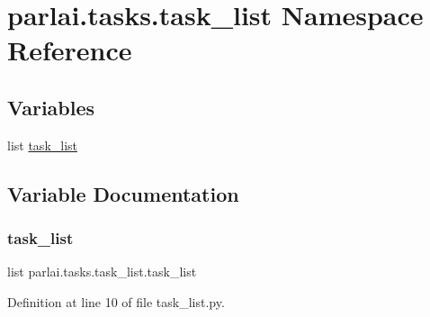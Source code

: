 \hypertarget{namespaceparlai_1_1tasks_1_1task__list}{}\section{parlai.\+tasks.\+task\+\_\+list Namespace Reference}
\label{namespaceparlai_1_1tasks_1_1task__list}
\subsection*{Variables}
\begin{DoxyCompactItemize}
\item 
list \hyperlink{namespaceparlai_1_1tasks_1_1task__list_a9542b1f0c30a9cf43b5926448533aea2}{task\+\_\+list}
\end{DoxyCompactItemize}


\subsection{Variable Documentation}
\mbox{\label{namespaceparlai_1_1tasks_1_1task__list_a9542b1f0c30a9cf43b5926448533aea2}} 
\subsubsection{\texorpdfstring{task\+\_\+list}{task\_list}}
{\footnotesize\ttfamily list parlai.\+tasks.\+task\+\_\+list.\+task\+\_\+list}



Definition at line 10 of file task\+\_\+list.\+py.

